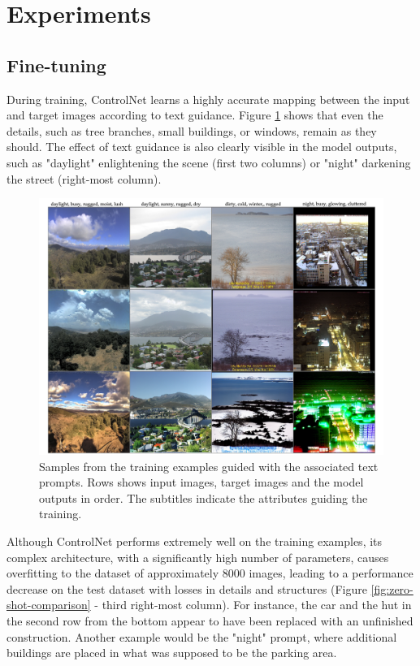 \section{Experiments}\label{zero-shot-exp}

\subsection{Fine-tuning}
During training, ControlNet learns a highly accurate mapping between the input and target images according to text guidance. Figure  \ref{fig:controlnet-train} shows that even the details, such as tree branches, small buildings, or windows, remain as they should. The effect of text guidance is also clearly visible in the model outputs, such as "daylight" enlightening the scene (first two columns) or "night" darkening the street (right-most column).
 
\begin{figure}[ht]
  \includegraphics[width=\textwidth]{Chapters/zero-shot-tat-figs/Controlnet2.png}
  \caption{Samples from the training examples guided with the associated text prompts. Rows shows input images, target images and the model outputs in order. The subtitles indicate the attributes guiding the training.}
  \label{fig:controlnet-train}
\end{figure}

Although ControlNet performs extremely well on the training examples, its complex architecture, with a significantly high number of parameters, causes overfitting to the dataset of approximately 8000 images, leading to a performance decrease on the test dataset with losses in details and structures (Figure \ref{fig:zero-shot-comparison} - third right-most column). For instance, the car and the hut in the second row from the bottom appear to have been replaced with an unfinished construction. Another example would be the "night" prompt, where additional buildings are placed in what was supposed to be the parking area.

